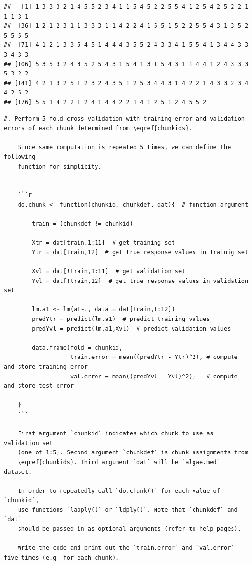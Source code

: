 \documentclass[]{article}
\begin{document}
\begin{verbatim}
##   [1] 1 3 3 3 2 1 4 5 5 2 3 4 1 1 5 4 5 2 2 5 5 4 1 2 5 4 2 5 2 2 1 1 1 3 1
##  [36] 1 2 1 2 3 1 1 3 3 3 1 1 4 2 2 4 1 5 5 1 5 2 2 5 5 4 3 1 3 5 2 5 5 5 5
##  [71] 4 1 2 1 3 3 5 4 5 1 4 4 4 3 5 5 2 4 3 3 4 1 5 5 4 1 3 4 4 3 3 3 4 3 3
## [106] 5 3 5 3 2 4 3 5 2 5 4 3 1 5 4 1 3 1 5 4 3 1 1 4 4 1 2 4 3 3 3 5 3 2 2
## [141] 4 2 1 3 2 5 1 2 3 2 4 3 5 1 2 5 3 4 4 3 1 4 2 2 1 4 3 3 2 3 4 4 2 5 2
## [176] 5 5 1 4 2 2 1 2 4 1 4 4 2 2 1 4 1 2 5 1 2 4 5 5 2
\end{verbatim}

\begin{verbatim}
#. Perform 5-fold cross-validation with training error and validation
errors of each chunk determined from \eqref{chunkids}. 

    Since same computation is repeated 5 times, we can define the following
    function for simplicity.


    ```r
    do.chunk <- function(chunkid, chunkdef, dat){  # function argument
      
        train = (chunkdef != chunkid)
    
        Xtr = dat[train,1:11]  # get training set
        Ytr = dat[train,12]  # get true response values in trainig set
    
        Xvl = dat[!train,1:11]  # get validation set
        Yvl = dat[!train,12]  # get true response values in validation set
    
        lm.a1 <- lm(a1~., data = dat[train,1:12])
        predYtr = predict(lm.a1)  # predict training values
        predYvl = predict(lm.a1,Xvl)  # predict validation values
    
        data.frame(fold = chunkid,
                   train.error = mean((predYtr - Ytr)^2), # compute and store training error
                   val.error = mean((predYvl - Yvl)^2))   # compute and store test error
    
    }
    ```
    
    First argument `chunkid` indicates which chunk to use as validation set
    (one of 1:5). Second argument `chunkdef` is chunk assignments from
    \eqref{chunkids}. Third argument `dat` will be `algae.med` dataset.
    
    In order to repeatedly call `do.chunk()` for each value of `chunkid`,
    use functions `lapply()` or `ldply()`. Note that `chunkdef` and `dat`
    should be passed in as optional arguments (refer to help pages).

    Write the code and print out the `train.error` and `val.error` five times (e.g. for each chunk).
\end{verbatim}
\end{document}
